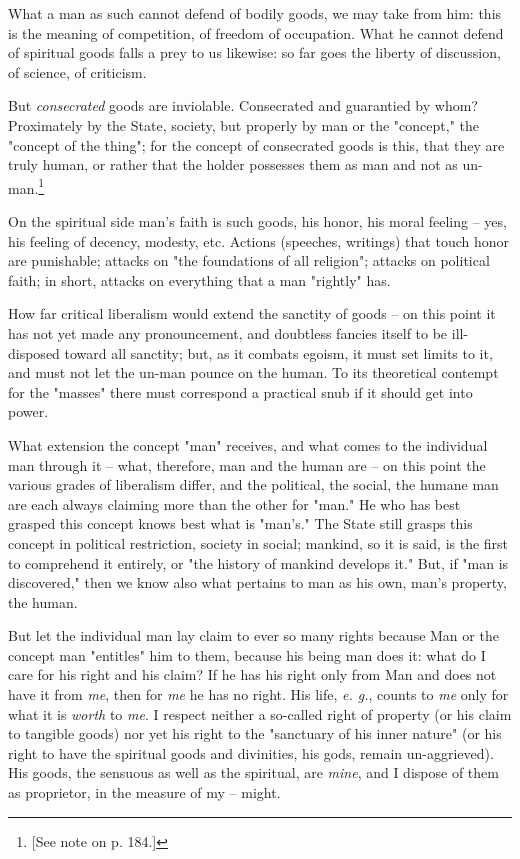 \documentclass[a4paper]{book}
\begin{document}
What a man as such cannot defend of bodily goods, we may take from him: this 
is the meaning of competition, of freedom of occupation. What he cannot defend 
of spiritual goods falls a prey to us likewise: so far goes the liberty of 
discussion, of science, of criticism.

But \textit{consecrated} goods are inviolable. Consecrated and guarantied by 
whom? Proximately by the State, society, but properly by man or the 
"{}concept,"{} the "{}concept of the thing"{}; for the concept of consecrated 
goods is this, that they are truly human, or rather that the holder possesses 
them as man and not as un-man.\footnote{[See note on p. 184.]}

On the spiritual side man's faith is such goods, his honor, his moral feeling 
-- yes, his feeling of decency, modesty, etc. Actions (speeches, writings) 
that touch honor are punishable; attacks on "{}the foundations of all 
religion"{}; attacks on political faith; in short, attacks on everything that 
a man "{}rightly"{} has.

How far critical liberalism would extend the sanctity of goods -- on this 
point it has not yet made any pronouncement, and doubtless fancies itself to 
be ill-disposed toward all sanctity; but, as it combats egoism, it must set 
limits to it, and must not let the un-man pounce on the human. To its 
theoretical contempt for the "{}masses"{} there must correspond a practical 
snub if it should get into power.

What extension the concept "{}man"{} receives, and what comes to the 
individual man through it -- what, therefore, man and the human are -- on this 
point the various grades of liberalism differ, and the political, the social, 
the humane man are each always claiming more than the other for "{}man."{} He 
who has best grasped this concept knows best what is "{}man's."{} The State 
still grasps this concept in political restriction, society in social; 
mankind, so it is said, is the first to comprehend it entirely, or "{}the 
history of mankind develops it."{} But, if "{}man is discovered,"{} then we 
know also what pertains to man as his own, man's property, the human.

But let the individual man lay claim to ever so many rights because Man or the 
concept man "{}entitles"{} him to them, because his being man does it: what do 
I care for his right and his claim? If he has his right only from Man and does 
not have it from \textit{me}, then for \textit{me} he has no right. His life, 
\textit{e. g.}, counts to \textit{me} only for what it is \textit{worth} to 
\textit{me}. I respect neither a so-called right of property (or his claim to 
tangible goods) nor yet his right to the "{}sanctuary of his inner nature"{} 
(or his right to have the spiritual goods and divinities, his gods, remain 
un-aggrieved). His goods, the sensuous as well as the spiritual, are 
\textit{mine}, and I dispose of them as proprietor, in the measure of my -- 
might.
\end{document}
